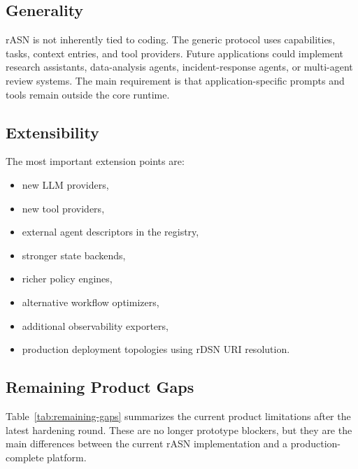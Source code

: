 \documentclass[manuscript,screen,review]{acmart}
\newcommand{\rasn}{rASN\xspace}
\newcommand{\rdsn}{rDSN\xspace}
\begin{document}
\subsection{Generality}

\rasn is not inherently tied to coding. The generic protocol uses capabilities,
tasks, context entries, and tool providers. Future applications could implement
research assistants, data-analysis agents, incident-response agents, or
multi-agent review systems. The main requirement is that application-specific
prompts and tools remain outside the core runtime.

\subsection{Extensibility}

The most important extension points are:

\begin{itemize}
  \item new LLM providers,
  \item new tool providers,
  \item external agent descriptors in the registry,
  \item stronger state backends,
  \item richer policy engines,
  \item alternative workflow optimizers,
  \item additional observability exporters,
  \item production deployment topologies using \rdsn URI resolution.
\end{itemize}

\subsection{Remaining Product Gaps}

Table~\ref{tab:remaining-gaps} summarizes the current product limitations after
the latest hardening round. These are no longer prototype blockers, but they are
the main differences between the current \rasn implementation and a
production-complete platform.
\end{document}
